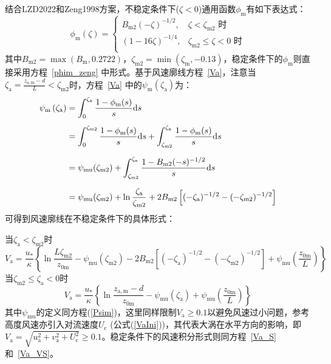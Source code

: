 结合LZD2022和Zeng1998方案，不稳定条件下($\zeta<0$)通用函数$\phi_{\mathrm{m}}$有如下表达式：
\begin{equation}
  \phi_{\mathrm{m}}(\zeta)= \begin{cases}
    B_{\mathrm{m2}}(-\zeta)^{-1/2}, & \zeta<\zeta_{\mathrm{m2}} \text { 时} \\
    (1-16 \zeta)^{-1/4}, & \zeta_{\mathrm{m2}} \leqslant \zeta<0 \text { 时} \\
  \end{cases}
\end{equation}
其中$B_{\mathrm{m2}}=\max(B_{\mathrm{m}},0.2722)$，$\zeta_{\mathrm{m2}}=\min(\zeta_{\mathrm{m}},-0.13)$，稳定条件下的$\phi_{\mathrm{m}}$则直接采用方程~\eqref{phim_zeng} 中形式。基于风速廓线方程~\eqref{Va}，注意当
$\zeta_{\mathrm{a}}=\frac{z_{\mathrm{a,m}}-d}{L}<\zeta_{\mathrm{m2}}$时，方程~\eqref{Va} 中的$\psi_{\mathrm{m}}\left(\zeta_{\mathrm{a}}\right)$为：
\begin{align}
  \psi_{\mathrm{m}}\left(\zeta_{\mathrm{a}}\right) &= \int_{0}^{\zeta_{\mathrm{a}}} \frac{1-\phi_{\mathrm{m}}(s)}{s}{\mathrm d} s  \nonumber \\[1ex]
  & = \int_{0}^{\zeta_{\mathrm{m2}}} \frac{1-\phi_{\mathrm{m}}(s)}{s}{\mathrm d} s + \int_{\zeta_{\rm m2}}^{\zeta_{\mathrm{a}}} \frac{1-\phi_{\mathrm{m}}(s)}{s}{\mathrm d} s  \nonumber \\[1.5ex]
  &= \psi_{\mathrm{mu}}(\zeta_{\mathrm{m2}}) + \int_{\zeta_{\mathrm m2}}^{\zeta_{\mathrm{a}}} \frac{1-B_{\mathrm{m2}}(-s)^{-1/2}}{s}{\mathrm d} s  \nonumber \\[1.5ex]
  & = \psi_{\mathrm{mu}}(\zeta_{\mathrm{m2}}) + \ln \frac{\zeta_{\mathrm{a}}}{\zeta_{\mathrm{m2}}} + 2B_{\mathrm{m2}}\left[(-\zeta_{\mathrm{a}})^{-1/2}-(-\zeta_{\mathrm{m2}})^{-1/2}\right]
\end{align}
可得到风速廓线在不稳定条件下的具体形式：

\noindent 当$\zeta_{\mathrm{a}}<\zeta_{\mathrm{m2}}$时
\begin{equation}\label{Va_U_LZD1}
  V_{\mathrm{a}}=\frac{u_{*}}{\kappa}\left\{\ln \frac{L\zeta_{\mathrm{m2}}}{z_{\mathrm{0 m}}}-\psi_{\mathrm{mu}}\left(\zeta_{\mathrm{m2}}\right)-2B_{\mathrm{m2}}\left[(-\zeta_{\mathrm{a}})^{-1/2}-(-\zeta_{\mathrm{m2}})^{-1/2}\right]+\psi_{\mathrm{mu}}\left(\frac{z_{\mathrm{0 m}}}{L}\right)\right\}
\end{equation}
\noindent 当$ \zeta_{\mathrm{m2}} \leqslant \zeta_{\mathrm{a}}<0$时
\begin{equation}\label{Va_U_LZD2}
  V_{\mathrm{a}}=\frac{u_{*}}{\kappa}\left\{\ln \frac{z_{\mathrm{a, m}}-d}{z_{\mathrm{0 m}}}-\psi_{\mathrm{mu}}\left(\zeta_{\mathrm{a}}\right)+\psi_{\mathrm{mu}}\left(\frac{z_{\mathrm{0 m}}}{L}\right)\right\}
\end{equation}
其中$\psi_{\mathrm{mu}}$的定义同方程(\ref{Psim})，这里同样限制$V_{\mathrm {a}}\geqslant0.1$以避免风速过小问题，参考高度风速亦引入对流速度$U_{\mathrm {c}}$ (公式(\ref{VaIni}))，其代表大涡在水平方向的影响，即
$V_{\mathrm{a}}=\sqrt{u_{\mathrm{a}}^{2}+v_{\mathrm{a}}^{2}+U_{\mathrm{c}}^{2}} \geqslant 0.1$。稳定条件下的风速积分形式则同方程~\eqref{Va_S} 和~\eqref{Va_VS}。


